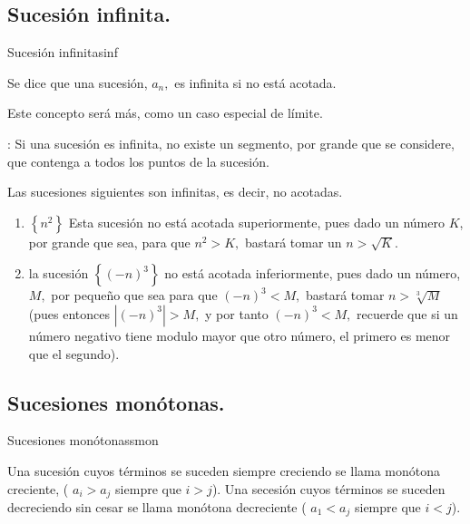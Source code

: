 \subsection{Sucesión infinita.}

\begin{defi}{Sucesión infinita}{sinf}

Se dice que una sucesión, $a_{n},$ es infinita si no está acotada. 

\end{defi}

Este concepto será más, como un caso especial de límite.

: Si una sucesión es infinita, no existe un
segmento, por grande que se considere, que contenga a todos los puntos
de la sucesión. 

\begin{ejemplos}

Las sucesiones siguientes son infinitas, es decir, no acotadas.
\begin{enumerate}
\item $\left\{ n^{2}\right\} $ Esta sucesión no está acotada superiormente,
pues dado un número $K$, por grande que sea, para que $n^{2}>K,$
bastará tomar un $n>\sqrt{K}.$
\item la sucesión $\left\{ \left(-n\right)^{3}\right\} $ no está acotada
inferiormente, pues dado un número, $M,$ por pequeño que sea para
que $\left(-n\right)^{3}<M,$ bastará tomar $n>\sqrt[3]{M}$ (pues
entonces $\left|\left(-n\right)^{3}\right|>M,$ y por tanto $\left(-n\right)^{3}<M,$
recuerde que si un número negativo tiene modulo mayor que otro número,
el primero es menor que el segundo). 
\end{enumerate}
\end{ejemplos}

\subsection{Sucesiones monótonas.}

\begin{defi}{Sucesiones monótonas}{smon}

Una sucesión cuyos términos se suceden siempre creciendo se llama
monótona creciente, ( $a_{i}>a_{j}$ siempre que $i>j$). Una secesión
cuyos términos se suceden decreciendo sin cesar se llama monótona
decreciente ( $a_{1}<a_{j}$ siempre que $i<j$). 

\end{defi}

